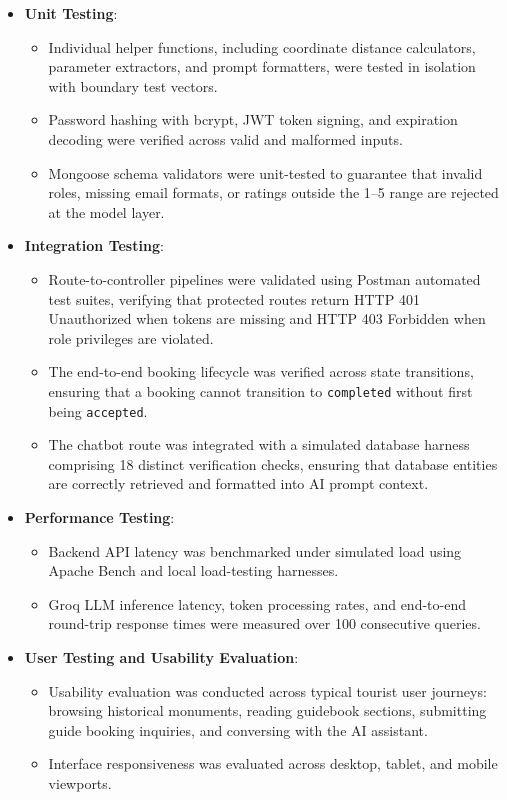 \documentclass[12pt,a4paper,twoside,openright]{report}
\begin{document}
\begin{itemize}[leftmargin=*]
    \item \textbf{Unit Testing}:
    \begin{itemize}
        \item Individual helper functions, including coordinate distance calculators, parameter extractors, and prompt formatters, were tested in isolation with boundary test vectors.
        \item Password hashing with bcrypt, JWT token signing, and expiration decoding were verified across valid and malformed inputs.
        \item Mongoose schema validators were unit-tested to guarantee that invalid roles, missing email formats, or ratings outside the 1--5 range are rejected at the model layer.
    \end{itemize}

    \item \textbf{Integration Testing}:
    \begin{itemize}
        \item Route-to-controller pipelines were validated using Postman automated test suites, verifying that protected routes return HTTP 401 Unauthorized when tokens are missing and HTTP 403 Forbidden when role privileges are violated.
        \item The end-to-end booking lifecycle was verified across state transitions, ensuring that a booking cannot transition to \texttt{completed} without first being \texttt{accepted}.
        \item The chatbot route was integrated with a simulated database harness comprising 18 distinct verification checks, ensuring that database entities are correctly retrieved and formatted into AI prompt context.
    \end{itemize}

    \item \textbf{Performance Testing}:
    \begin{itemize}
        \item Backend API latency was benchmarked under simulated load using Apache Bench and local load-testing harnesses.
        \item Groq LLM inference latency, token processing rates, and end-to-end round-trip response times were measured over 100 consecutive queries.
    \end{itemize}

    \item \textbf{User Testing and Usability Evaluation}:
    \begin{itemize}
        \item Usability evaluation was conducted across typical tourist user journeys: browsing historical monuments, reading guidebook sections, submitting guide booking inquiries, and conversing with the AI assistant.
        \item Interface responsiveness was evaluated across desktop, tablet, and mobile viewports.
    \end{itemize}
\end{itemize}
\end{document}
